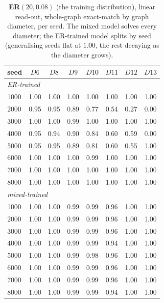 \documentclass[11pt,a4paper]{article}
\begin{document}
\begin{table}[H]\centering\small
\begin{tabular}{lccccccc}
\toprule
seed & $D6$ & $D8$ & $D9$ & $D10$ & $D11$ & $D12$ & $D13$ \\
\midrule
\multicolumn{8}{l}{\emph{ER-trained}}\\
1000 & 1.00 & 1.00 & 1.00 & 1.00 & 1.00 & 1.00 & 1.00 \\
2000 & 0.95 & 0.95 & 0.89 & 0.77 & 0.54 & 0.27 & 0.00 \\
3000 & 1.00 & 1.00 & 0.99 & 1.00 & 1.00 & 1.00 & 1.00 \\
4000 & 0.95 & 0.94 & 0.90 & 0.84 & 0.60 & 0.59 & 0.00 \\
5000 & 0.95 & 0.95 & 0.89 & 0.81 & 0.60 & 0.55 & 1.00 \\
6000 & 1.00 & 1.00 & 1.00 & 0.99 & 1.00 & 1.00 & 1.00 \\
7000 & 1.00 & 1.00 & 1.00 & 1.00 & 1.00 & 1.00 & 1.00 \\
8000 & 1.00 & 1.00 & 1.00 & 1.00 & 1.00 & 1.00 & 1.00 \\
\midrule
\multicolumn{8}{l}{\emph{mixed-trained}}\\
1000 & 1.00 & 1.00 & 0.99 & 0.99 & 0.96 & 1.00 & 1.00 \\
2000 & 1.00 & 1.00 & 0.99 & 0.99 & 0.96 & 1.00 & 1.00 \\
3000 & 1.00 & 1.00 & 0.99 & 0.99 & 0.96 & 1.00 & 1.00 \\
4000 & 1.00 & 1.00 & 0.99 & 0.99 & 0.94 & 1.00 & 1.00 \\
5000 & 1.00 & 1.00 & 0.99 & 0.98 & 0.96 & 1.00 & 1.00 \\
6000 & 1.00 & 1.00 & 0.99 & 0.99 & 0.96 & 1.00 & 1.00 \\
7000 & 1.00 & 1.00 & 0.99 & 0.99 & 0.96 & 1.00 & 1.00 \\
8000 & 1.00 & 1.00 & 0.99 & 0.99 & 0.94 & 1.00 & 1.00 \\
\bottomrule\end{tabular}
\caption{\textbf{ER}$(20,0.08)$ (the training distribution), linear read-out, whole-graph exact-match by graph
diameter, per seed. The mixed model solves every diameter; the ER-trained model splits by seed
(generalising seeds flat at $1.00$, the rest decaying as the diameter grows).}
\label{tab:byd_er_n20}
\end{table}
\end{document}
